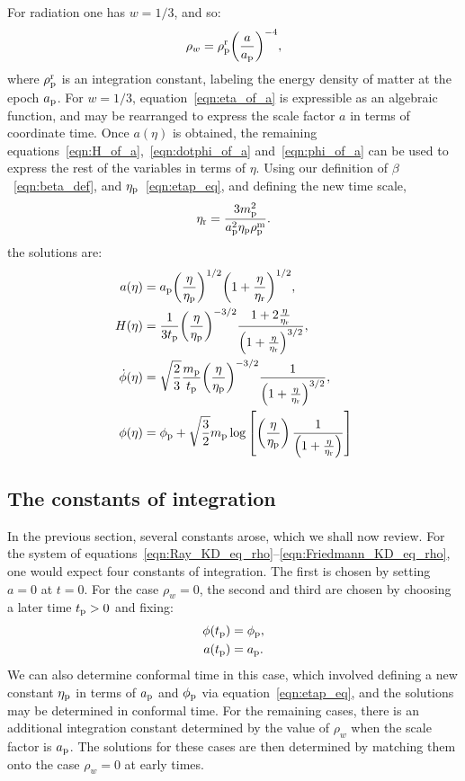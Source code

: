 For radiation one has $w=1/3$, and so:
%
\begin{equation}
  \rho_w = \rho_{\mathrm{p}}^{\mathrm{r}}{\left(\frac{a}{a_{\mathrm{p}}}\right)}^{-4},
\end{equation}
%
where $\rho_{\mathrm{p}}^{\mathrm{r}}$ is an integration constant, labeling the energy density of matter at the epoch $a_{\mathrm{p}}$.  For $w=1/3$, equation~\eqref{eqn:eta_of_a} is expressible as an algebraic function, and may be rearranged to express the scale factor $a$ in terms of coordinate time. Once $a(\eta)$ is obtained, the remaining equations~\eqref{eqn:H_of_a},~\eqref{eqn:dotphi_of_a} and~\eqref{eqn:phi_of_a} can be used to express the rest of the variables in terms of $\eta$. Using our definition of $\beta$~\ref{eqn:beta_def}, and $\eta_{\mathrm{p}}$~\ref{eqn:etap_eq}, and defining the new time scale,
%
\begin{equation}
  \eta_{\mathrm{r}} = \frac{3m_{\mathrm{p}}^2}{a_{\mathrm{p}}^2\eta_{\mathrm{p}}\rho_{\mathrm{p}}^{\mathrm{m}}}.
  \label{eqn:etar}
\end{equation}
%
the solutions are:
%
\begin{align}
  a(\eta)
  &=
  a_{\mathrm{p}}{\left(\frac{\eta}{\eta_{\mathrm{p}}}\right)}^{1/2}
  {\left({1+\frac{\eta}{\eta_{\mathrm{r}}}}\right)}^{1/2},
  \\
  H(\eta) 
  &= 
  \frac{1}{3t_{\mathrm{p}}}{\left(\frac{\eta}{\eta_{\mathrm{p}}}\right)}^{-3/2}
  \frac{1+ 2\frac{\eta}{\eta_{\mathrm{r}}}}
  {{\left(1+ \frac{\eta}{\eta_{\mathrm{r}}}\right)}^{3/2}},
  \\
  \dot{\phi}(\eta) 
  &=
  \sqrt{\frac{2}{3}}\frac{m_{\mathrm{p}}}{t_{\mathrm{p}}}
  {\left(\frac{\eta}{\eta_{\mathrm{p}}}\right)}^{-3/2}
  \frac{1}{{\left(1+ \frac{\eta}{\eta_{\mathrm{r}}}\right)}^{3/2}},
  \\ 
  \phi(\eta) 
  &=
  \phi_{\mathrm{p}}+\sqrt {\frac{3}{2}}m_{\mathrm{p}}\log  
  \left[
  \left(\frac{\eta}{\eta_{\mathrm{p}}}\right)
  \frac {1}{\left(1+ \frac{\eta}{\eta_{\mathrm{r}}}\right)} 
  \right] 
\end{align}
%

\subsection{The constants of integration}
\label{sec:constants}
In the previous section, several constants arose, which we shall now review. For the system of equations~\eqref{eqn:Ray_KD_eq_rho}--\eqref{eqn:Friedmann_KD_eq_rho}, one would expect four constants of integration. The first is chosen by setting $a=0$ at $t=0$. For the case $\rho_w=0$, the second and third are chosen by choosing a later time $t_{\mathrm{p}}>0$ and fixing:
%
\begin{align}
  \phi(t_{\mathrm{p}}) &= \phi_{\mathrm{p}}, \nonumber\\
  a(t_{\mathrm{p}}) &= a_{\mathrm{p}}. \nonumber
\end{align}
%
We can also determine conformal time in this case, which involved defining a new constant $\eta_{\mathrm{p}}$ in terms of $a_{\mathrm{p}}$ and $\phi_{\mathrm{p}}$ via equation~\eqref{eqn:etap_eq}, and the solutions may be determined in conformal time. For the remaining cases, there is an additional integration constant determined by the value of $\rho_w$ when the scale factor is $a_{\mathrm{p}}$. The solutions for these cases are then determined by matching them onto the case $\rho_w=0$ at early times.

